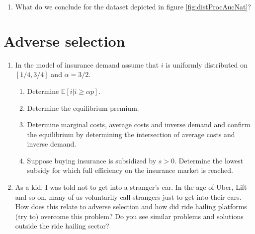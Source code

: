 \documentclass[a4paper,12pt]{article}
\begin{document}
\begin{enumerate}[resume]
\begin{enumerate}
    \item What do we conclude for the dataset depicted in figure \ref{fig:distProcAucNat}?
    \end{enumerate}
\end{enumerate}

\section{Adverse selection}
\label{sec:adverse-selection}

\begin{enumerate}[resume]
\item In the model of insurance demand assume that $i$ is uniformly distributed on $[1/4,3/4]$ and $\alpha=3/2$.
  \begin{enumerate}
  \item Determine $\mathbb{E}[i|i\geq\alpha p]$.
  \item Determine the equilibrium premium.
  \item Determine marginal costs, average costs and inverse demand and confirm the equilibrium by determining the intersection of average costs and inverse demand.
    \item Suppose buying insurance is subsidized by $s>0$. Determine the lowest subsidy for which full efficiency on the insurance market is reached.
    \end{enumerate}
  \item As a kid, I was told not to get into a stranger's car. In the age of Uber, Lift and so on, many of us voluntarily call strangers just to get into their cars. How does this relate to adverse selection and how did ride hailing platforms (try to) overcome this problem? Do you see similar problems and solutions outside the ride hailing sector?

\end{enumerate}
\end{document}
